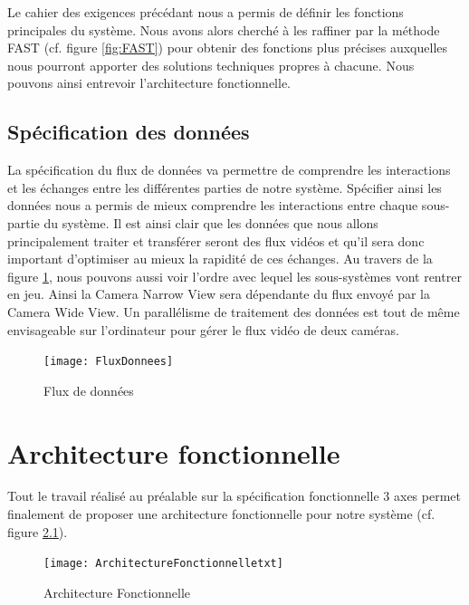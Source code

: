 Le cahier des exigences précédant nous a permis de définir les fonctions principales du système. Nous avons alors cherché à les raffiner par la méthode FAST (cf. figure \ref{fig:FAST}) pour obtenir des fonctions plus précises auxquelles nous pourront apporter des solutions techniques propres à chacune. Nous pouvons ainsi entrevoir l'architecture fonctionnelle.

\section{Spécification des données}

La spécification du flux de données va permettre de comprendre les interactions et les échanges entre les différentes parties de notre système. Spécifier ainsi les données nous a permis de mieux comprendre les interactions entre chaque sous-partie du système. Il est ainsi clair que les données que nous allons principalement traiter et transférer seront des flux vidéos et qu’il sera donc important d’optimiser au mieux la rapidité de ces échanges.
Au travers de la figure \ref{fig:fluxDonnees}, nous pouvons aussi voir l’ordre avec lequel les sous-systèmes vont rentrer en jeu. Ainsi la Camera Narrow View sera dépendante du flux envoyé par la Camera Wide View. Un parallélisme de traitement des données est tout de même envisageable sur l'ordinateur pour gérer le flux vidéo de deux caméras.

\begin{figure}[h]
  \centering
  \texttt{[image: FluxDonnees]}
  \caption{Flux de données}
  \label{fig:fluxDonnees}
\end{figure}


\chapter{Architecture fonctionnelle}

Tout le travail réalisé au préalable sur la spécification fonctionnelle 3 axes permet finalement de proposer une architecture fonctionnelle pour notre système (cf. figure \ref{fig:archiFonctionnelle}).
 
\begin{figure}[h]
  \centering
  \texttt{[image: ArchitectureFonctionnelletxt]}
  \caption{Architecture Fonctionnelle}
  \label{fig:archiFonctionnelle}
\end{figure}

